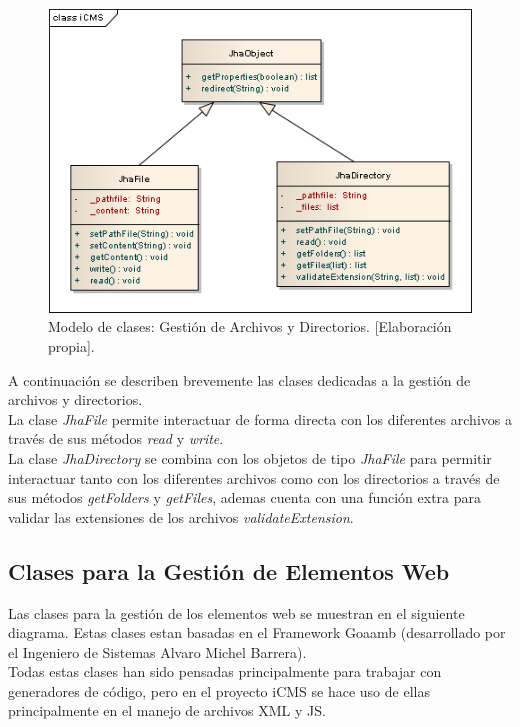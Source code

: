 \begin{figure}[h]
\centering
\includegraphics[scale=.5, keepaspectratio=true]{imagenes/07_imagen.png}
\caption{Modelo de clases: Gesti\'on de Archivos y Directorios. [Elaboraci\'on propia].}
\end{figure}

A continuaci\'on se describen brevemente las clases dedicadas a la gesti\'on de archivos y directorios.\\

La clase \emph{JhaFile} permite interactuar de forma directa con los diferentes archivos a trav\'es de sus m\'etodos \emph{read} y \emph{write}.\\



La clase \emph{JhaDirectory} se combina con los objetos de tipo \emph{JhaFile} para permitir interactuar tanto con los diferentes archivos como con los directorios a trav\'es de sus m\'etodos \emph{getFolders} y \emph{getFiles}, ademas cuenta con una funci\'on extra para validar las extensiones de los archivos \emph{validateExtension}.\\



\subsection{Clases para la Gesti\'on de Elementos Web}
Las clases para la gesti\'on de los elementos web se muestran en el siguiente diagrama. Estas clases estan basadas en el Framework Goaamb (desarrollado por el Ingeniero de Sistemas Alvaro Michel Barrera).\\
Todas estas clases han sido pensadas principalmente para trabajar con generadores de c\'odigo, pero en el proyecto iCMS se hace uso de ellas principalmente en el manejo de archivos XML y JS.\\

